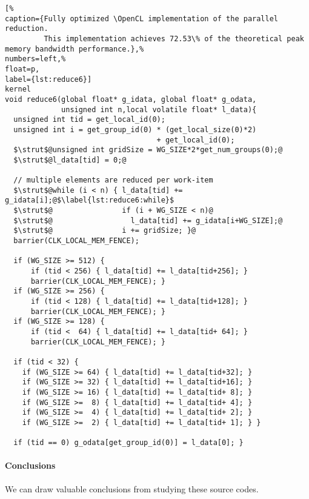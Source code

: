 \begin{lstlisting}[%                                                             
caption={Fully optimized \OpenCL implementation of the parallel reduction.
         This implementation achieves 72.53\% of the theoretical peak memory bandwidth performance.},%
numbers=left,%
float=p,
label={lst:reduce6}]
kernel
void reduce6(global float* g_idata, global float* g_odata,
             unsigned int n,local volatile float* l_data){
  unsigned int tid = get_local_id(0);
  unsigned int i = get_group_id(0) * (get_local_size(0)*2)
                                   + get_local_id(0);
  $\strut$@unsigned int gridSize = WG_SIZE*2*get_num_groups(0);@
  $\strut$@l_data[tid] = 0;@

  // multiple elements are reduced per work-item
  $\strut$@while (i < n) { l_data[tid] += g_idata[i];@$\label{lst:reduce6:while}$
  $\strut$@                if (i + WG_SIZE < n)@
  $\strut$@                  l_data[tid] += g_idata[i+WG_SIZE];@
  $\strut$@                i += gridSize; }@
  barrier(CLK_LOCAL_MEM_FENCE);

  if (WG_SIZE >= 512) {
      if (tid < 256) { l_data[tid] += l_data[tid+256]; }
      barrier(CLK_LOCAL_MEM_FENCE); }
  if (WG_SIZE >= 256) {
      if (tid < 128) { l_data[tid] += l_data[tid+128]; }
      barrier(CLK_LOCAL_MEM_FENCE); }
  if (WG_SIZE >= 128) {
      if (tid <  64) { l_data[tid] += l_data[tid+ 64]; }
      barrier(CLK_LOCAL_MEM_FENCE); }
  
  if (tid < 32) {
    if (WG_SIZE >= 64) { l_data[tid] += l_data[tid+32]; }
    if (WG_SIZE >= 32) { l_data[tid] += l_data[tid+16]; }
    if (WG_SIZE >= 16) { l_data[tid] += l_data[tid+ 8]; }
    if (WG_SIZE >=  8) { l_data[tid] += l_data[tid+ 4]; }
    if (WG_SIZE >=  4) { l_data[tid] += l_data[tid+ 2]; }
    if (WG_SIZE >=  2) { l_data[tid] += l_data[tid+ 1]; } }
  
  if (tid == 0) g_odata[get_group_id(0)] = l_data[0]; }
\end{lstlisting}


\paragraph{Conclusions}
We can draw valuable conclusions from studying these \OpenCL source codes.

